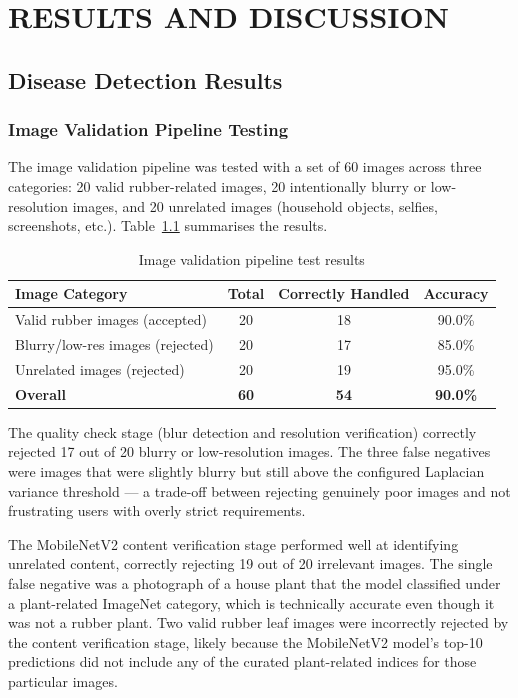 \chapter{RESULTS AND DISCUSSION}

\section{Disease Detection Results}

\subsection{Image Validation Pipeline Testing}

The image validation pipeline was tested with a set of 60 images across three categories: 20 valid rubber-related images, 20 intentionally blurry or low-resolution images, and 20 unrelated images (household objects, selfies, screenshots, etc.). Table~\ref{tab:validation_results} summarises the results.

\begin{table}[H]
\centering
\caption{Image validation pipeline test results}
\label{tab:validation_results}
\begin{tabular}{|l|c|c|c|}
\hline
\textbf{Image Category} & \textbf{Total} & \textbf{Correctly Handled} & \textbf{Accuracy} \\
\hline
Valid rubber images (accepted) & 20 & 18 & 90.0\% \\
\hline
Blurry/low-res images (rejected) & 20 & 17 & 85.0\% \\
\hline
Unrelated images (rejected) & 20 & 19 & 95.0\% \\
\hline
\textbf{Overall} & \textbf{60} & \textbf{54} & \textbf{90.0\%} \\
\hline
\end{tabular}
\end{table}

The quality check stage (blur detection and resolution verification) correctly rejected 17 out of 20 blurry or low-resolution images. The three false negatives were images that were slightly blurry but still above the configured Laplacian variance threshold --- a trade-off between rejecting genuinely poor images and not frustrating users with overly strict requirements.

The MobileNetV2 content verification stage performed well at identifying unrelated content, correctly rejecting 19 out of 20 irrelevant images. The single false negative was a photograph of a house plant that the model classified under a plant-related ImageNet category, which is technically accurate even though it was not a rubber plant. Two valid rubber leaf images were incorrectly rejected by the content verification stage, likely because the MobileNetV2 model's top-10 predictions did not include any of the curated plant-related indices for those particular images.

